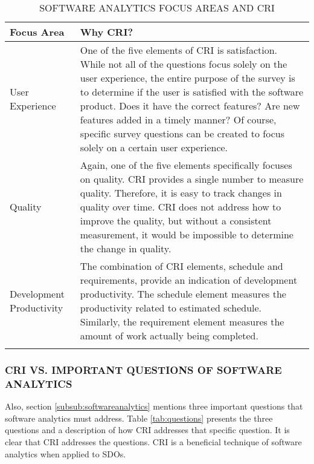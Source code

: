 \documentclass[SDSUThesis.tex]{subfiles}
\begin{document}
            \begin{longtable}{p{3cm}p{11cm}}
                \toprule%
                 \centering%
                 {\bfseries Focus Area}
                 & {\bfseries Why CRI?} \\
                
                \cmidrule[0.4pt](r{0.125em}){1-1}%
                \cmidrule[0.4pt](lr{0.125em}){2-2}%
                \endhead
                
                User Experience & One of the five elements of CRI is satisfaction.  While not all of the questions focus solely on the user experience, the entire purpose of the survey is to determine if the user is satisfied
                with the software product. Does it have the correct features? Are new features added in a timely manner? Of course, specific survey questions can be created to focus solely on a certain user experience. \\
                \myrowcolour%
                Quality & Again, one of the five elements specifically focuses on quality.  CRI provides a single number
                to measure quality.  Therefore, it is easy to track changes in quality over time.  CRI does not address
                how to improve the quality, but without a consistent measurement, it would be impossible to determine the change in quality. \\
                Development Productivity & The combination of CRI elements, schedule and requirements, provide an 
                indication of development productivity. The schedule element measures the productivity
                related to estimated schedule. Similarly, the requirement element measures the amount of
                work actually being completed.  \\
                
                \bottomrule
                
                \caption{SOFTWARE ANALYTICS FOCUS AREAS AND CRI}
                \label{tab:focusareas}
            \end{longtable}
        
        
        \subsubsection{CRI VS. IMPORTANT QUESTIONS OF SOFTWARE ANALYTICS}
            Also, section \ref{subsub:softwareanalytics} mentions three important questions that
            software analytics must address.  Table \ref{tab:questions} presents the three questions
            and a description of how CRI addresses that specific question.  It is clear
            that CRI addresses the questions.  CRI is a beneficial technique of software
            analytics when applied to SDOs.
        
\end{document}
